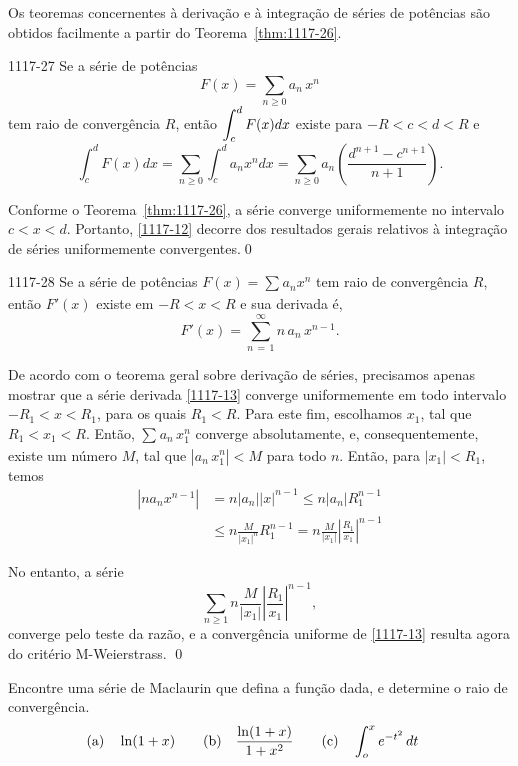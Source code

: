 Os teoremas concernentes à derivação e à integração de séries de potências são obtidos facilmente 
a partir do Teorema~\ref{thm:1117-26}.

\begin{theoc}{}{1117-27} Se a série de potências
\[
 F(x)=\sum_{n\geq 0}a_n\,x^n
\]
tem raio de convergência $R$, então $\displaystyle{\int_c^dF(x)dx}$ existe para $-R < c < d < R$ \quad e
\begin{equation}\label{1117-12}
\int_c^dF(x)dx=\sum_{n\geq 0}\int_c^d a_nx^ndx=\sum_{n\geq
0}a_n\left(\frac{d^{n+1}-c^{n+1}}{n+1}\right).
\end{equation}
\end{theoc}

\prova Conforme o Teorema~\ref{thm:1117-26}, a série converge
uniformemente no intervalo $c< x <d$. Portanto, \eqref{1117-12}
decorre dos resultados gerais relativos à integração de séries
uniformemente convergentes.\qed

\begin{theoc}{}{1117-28}
Se a série de potências $F(x)=\sum_{}a_nx^{n}$ tem raio
de convergência $R$, então $F'(x)$ existe em $-R< x <R$  e sua derivada é,
\begin{equation}\label{1117-13}
 F'(x)= \sum_{n\,=\, 1}^{\infty}n\,a_n\,x^{n-1}.
 \end{equation}
\end{theoc}

\prova De acordo com o teorema geral sobre derivação de séries,
precisamos apenas mostrar que a série derivada \eqref{1117-13}
converge uniformemente em todo intervalo $- R_1 < x < R_1$, para
os quais $R_1 < R$. Para este fim, escolhamos $x_1$, tal que $R_1
< x_1< R$. Então, $\sum_{}a_n\,x^n_{1}$ converge
absolutamente, e, consequentemente, existe um número $M$, tal que
$|a_n\,x^n_1|<M$ para todo $n$. Então, para $|x_1| < R_1$, temos
\begin{align*}
   |na_nx^{n-1}|&=n|a_n||x|^{n-1}
   \leq n|a_n|R_1^{n-1}  \\[2ex]
  &\leq n\frac{M}{|x_1|^n}R_1^{n-1}=n\frac{M}{|x_1|}\left|\frac{R_1}{x_1}\right|^{n-1}
\end{align*}

No entanto, a série
\[
\sum_{n\geq 1}n\frac{M}{|x_1|}\left|\frac{R_1}{x_1}\right|^{n-1},
\]
converge pelo teste da razão, e a convergência uniforme de
\eqref{1117-13} resulta agora do critério M-Weierstrass. \qed

\begin{exer}
Encontre  uma  série de Maclaurin que defina a função dada, e determine o raio de convergência.
\begin{align*}
\rm{(a)}&\quad \ln(1+x)\quad &\rm{(b)}&\quad \frac{\ln(1+x)}{1+x^2} \quad &\rm{(c)}&\quad \int_o^x e^{-t^2}\,dt
\end{align*}
\end{exer}

